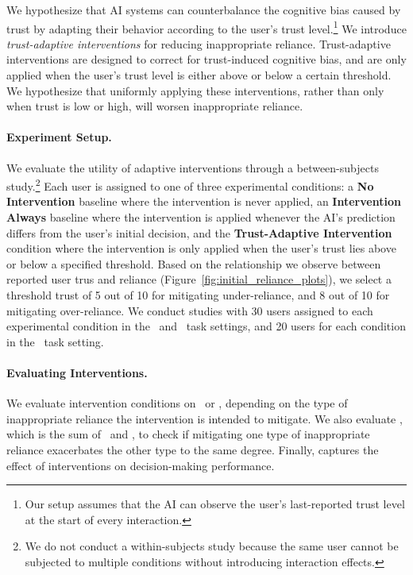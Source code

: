 We hypothesize that AI systems can counterbalance the cognitive bias caused by trust by adapting their behavior according to the user's trust level.\footnote{Our setup assumes that the AI can observe the user's last-reported trust level at the start of every interaction.} 
We introduce \emph{trust-adaptive interventions} for reducing inappropriate reliance. 
Trust-adaptive interventions are designed to correct for trust-induced cognitive bias, and are only applied when the user's trust level is either above or below a certain threshold. 
We hypothesize that uniformly applying these interventions, rather than only when trust is low or high, will worsen inappropriate reliance.

\paragraph{Experiment Setup.} We evaluate the utility of adaptive interventions through a between-subjects study.\footnote{We do not conduct a within-subjects study because the same user cannot be subjected to multiple conditions without introducing interaction effects.}
Each user is assigned to one of
three experimental conditions: a \textbf{No Intervention} baseline where the intervention is never applied, an \textbf{Intervention Always} baseline where the intervention is applied whenever the AI’s prediction differs from the user’s initial decision, and the \textbf{Trust-Adaptive Intervention} condition where the intervention is only applied when the user’s trust lies above or below a specified threshold.
Based on the relationship we observe between reported user trus and reliance (Figure~\ref{fig:initial_reliance_plots}), we select a threshold trust of 5 out of 10 for mitigating under-reliance, and 8 out of 10 for mitigating over-reliance. 
We conduct studies with 30 users assigned to each experimental condition in the \arcc\ and \arco\ task settings, and 20 users for each condition in the \diagc\ task setting.


\paragraph{Evaluating Interventions.} 
We evaluate intervention conditions on \underreliance\ or \overreliance, depending on the type of inappropriate reliance the intervention is intended to mitigate. 
We also evaluate \textbf{\totalinapprel}, which is the sum of \underreliance\ and \overreliance, to check if mitigating one type of inappropriate reliance exacerbates the other type to the same degree. 
Finally, \textbf{\finalacc} captures the effect of interventions on decision-making performance. 

